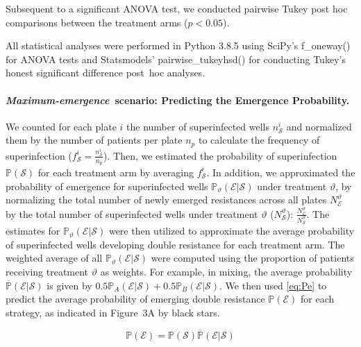 Subsequent to a significant ANOVA test, we conducted pairwise Tukey post hoc comparisons between the treatment arms ($p < 0.05$).

All statistical analyses were performed in Python 3.8.5 using SciPy's f\_oneway() \cite{Virtanen2020} for ANOVA tests and Statsmodels' pairwise\_tukeyhsd() \cite{seabold2010statsmodels} for conducting Tukey's honest significant difference post~hoc analyses.

\paragraph{\textit{Maximum-emergence}~scenario: Predicting the Emergence Probability.}
We counted for each plate $i$ the number of superinfected wells $n_{\mathcal S}^i$ and normalized them by the number of patients per plate $n_p$ to calculate the frequency of superinfection (\(f_{\mathcal S}^i = \frac{n^i_{\mathcal S}}{n_p}\)).
Then, we estimated the probability of superinfection \(\mathbb{P}({\mathcal S})\) for each treatment arm by averaging \(f_{\mathcal S}^i\).
In addition, we approximated the probability of emergence for superinfected wells  \(\mathbb{P}_\vartheta(\mathcal E|\mathcal S)\) under treatment \(\vartheta\), by normalizing the total number of newly emerged resistances across all plates $N^\vartheta_{\mathcal E}$ by the total number of superinfected wells under treatment \(\vartheta\) ($N^\vartheta_{\mathcal S}$): \(\frac{N^\vartheta_{\mathcal E}}{N^\vartheta_{\mathcal S}}\).
The estimates for \(\mathbb{P}_\vartheta(\mathcal E|\mathcal S)\) were then utilized to approximate the average probability of superinfected wells developing double resistance for each treatment arm.
The weighted average of all \(\mathbb{P}_\vartheta(\mathcal E|\mathcal S)\) were computed using the proportion of patients receiving treatment \(\vartheta\) as weights.
For example, in mixing, the average probability \(\overline{\mathbb{P}}(\mathcal E|\mathcal S)\) is given by \(0.5 \mathbb{P}_A(\mathcal E|\mathcal S) + 0.5 \mathbb{P}_B(\mathcal E|\mathcal S)\).
We then used \autoref{eq:Pe} to predict the average probability of emerging double resistance \(\mathbb{P}(\mathcal E)\) for each strategy, as indicated in Figure~3A by black stars.

\begin{equation}
\mathbb{P}(\mathcal E) = \mathbb{P}(\mathcal S)  \overline{\mathbb{P}}(\mathcal E|\mathcal S)
\label{eq:Pe}
\end{equation}

